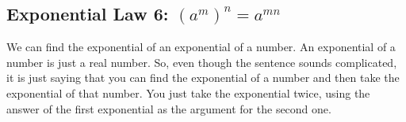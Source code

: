             \subsection{ Exponential Law 6: ${\left({a}^{m}\right)}^{n}={a}^{mn}$}
            \nopagebreak
        \label{m38359*id66531}We can find the exponential of an exponential of a number. An exponential of a number is just a real number. So, even though the sentence sounds complicated, it is just saying that you can find the exponential of a number and then take the exponential of that number. You just take the exponential twice, using the answer of the first exponential as the argument for the second one.\par 
        \label{m38359*uid35}\nopagebreak\noindent{}
